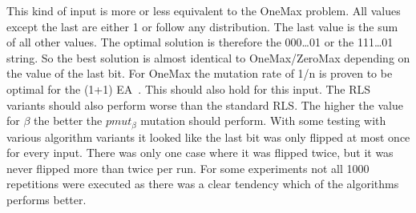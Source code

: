 This kind of input is more or less equivalent to the OneMax problem. All values except the last are either 1 or follow any distribution. The last value is the sum of all other values. The optimal solution is therefore the 000\dots01 or
the 111\dots01 string. So the best solution is almost identical to OneMax/ZeroMax depending on the value of the last bit.\newline
For OneMax the mutation rate of 1/n is proven to be optimal for the (1+1) EA~\cite{witt2013tight}.
This should also hold for this input.
The RLS variants should also perform worse than the standard RLS.
The higher the value for $\beta$ the better the $pmut_\beta$ mutation should perform.
With some testing with various algorithm variants it looked like the last bit was only flipped at most once for every input.
There was only one case where it was flipped twice, but it was never flipped more than twice per run.\newline
For some experiments not all 1000 repetitions were executed as there was a clear tendency which of the algorithms performs better.